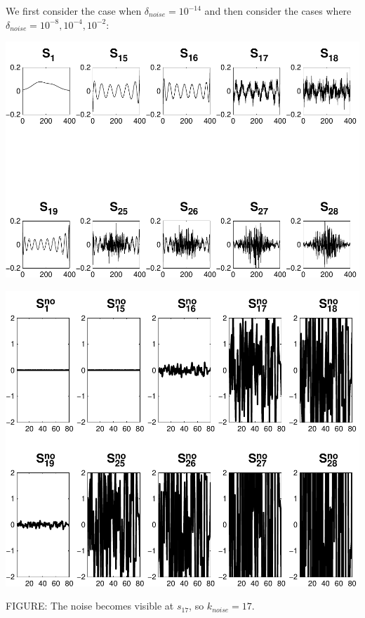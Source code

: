 \documentclass[11pt]{amsart}
\begin{document}
	We first consider the case when $\delta_{noise}=10^{-14}$ and then consider the cases
	where $\delta_{noise} = 10^{-8},10^{-4},10^{-2}$:


	\vspace{5mm}
	\begin{minipage}[t]{0.5\textwidth}
	
		\includegraphics[width=.95\linewidth]{figures/run1/sk_plots} 
   
	\end{minipage}
	\begin{minipage}[t]{0.5\textwidth}
	
		\includegraphics[width=.75\linewidth]{figures/run1/noise_parts} 
   
	\end{minipage}
	\begin{center}
		FIGURE: 
		The noise becomes visible at $s_17$, so $k_{noise} = 17$.
	\end{center} 
	\vspace{5mm}
\end{document}

